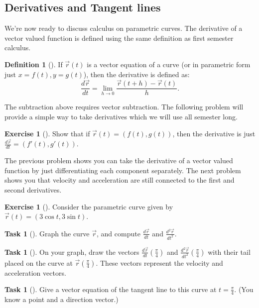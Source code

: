 \documentclass[10pt,]{book}
\theoremstyle{plain}
\theoremstyle{definition}
\newtheorem{definition}[theorem]{Definition}
\theoremstyle{definition}
\theoremstyle{definition}
\theoremstyle{definition}
\newtheorem{exploration}[project]{Exercise}
\newtheorem{task}[project]{Task}
\theoremstyle{definition}
\numberwithin{equation}{section}
\newcommand{\ds}{\displaystyle}
\begin{document}
\subsection[{Derivatives and Tangent lines}]{Derivatives and Tangent lines}\label{sec_derivatives_and_tangent_lines}
We're now ready to discuss calculus on parametric curves. The derivative of a vector valued function is defined using the same definition as first semester calculus.%
\begin{definition}[{}]\label{definition-19}
If \(\vec r(t)\) is a vector equation of a curve (or in parametric form just \(x=f(t), y=g(t)\)), then the derivative is defined as:%
\begin{equation*}
\frac{d\vec r}{dt}=\ds\lim_{h\to 0}\frac{\vec r(t+h)-\vec r(t)}{h}.
\end{equation*}
%
\end{definition}
The subtraction above requires vector subtraction. The following problem will provide a simple way to take derivatives which we will use all semester long.%
\begin{exploration}[]\label{exploration-77}
Show that if \(\vec r(t) = (f(t),g(t))\), then the derivative is just \(\frac{d\vec r}{dt} = (f'(t),g'(t))\).%
\par
[The definition above says that \(\frac{d\vec r}{dt}=\ds\lim_{h\to 0}\frac{\vec r(t+h)-\vec r(t)}{h}\). We were told \(\vec r(t) = (f(t),g(t))\), so use this in the derivative definition. Then try to modify the equation to obtain \(\frac{d\vec r}{dt} = (f'(t),g'(t))\).]%
\end{exploration}
The previous problem shows you can take the derivative of a vector valued function by just differentiating each component separately. The next problem shows you that velocity and acceleration are still connected to the first and second derivatives.%
\begin{exploration}[]\label{exploration-78}
Consider the parametric curve given by \(\vec r(t)=( 3\cos t, 3\sin t )\).%
\begin{task}[]\label{task-125}
Graph the curve \(\vec r\), and compute \(\frac{d\vec r}{dt}\) and \(\frac{d^2\vec r}{dt^2}\).%
\end{task}
\begin{task}[]\label{task-126}
On your graph, draw the vectors \(\frac{d\vec r}{dt}\left(\frac{\pi}{4}\right)\) and \(\frac{d^2\vec r}{dt^2}\left(\frac{\pi}{4}\right)\) with their tail placed on the curve at \(\vec r\left(\frac{\pi}{4}\right)\). These vectors represent the velocity and acceleration vectors.%
\end{task}
\begin{task}[]\label{task-127}
Give a vector equation of the tangent line to this curve at \(t=\frac{\pi}{4}\). (You know a point and a direction vector.)%
\end{task}
\end{exploration}
\end{document}
